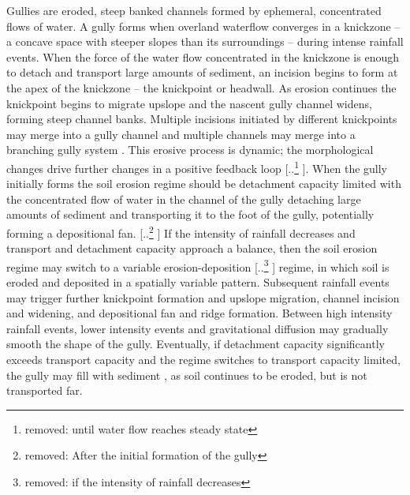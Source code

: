 \documentclass[gmd, manuscript]{copernicus}
\providecommand{\DIFadd}[1]{{\protect\color{blue} \sf #1}} %
\providecommand{\DIFdel}[1]{{\protect\color{red} [..\footnote{removed: #1} ]}} %
\providecommand{\DIFaddbegin}{} %
\providecommand{\DIFaddend}{} %
\providecommand{\DIFdelbegin}{} %
\providecommand{\DIFdelend}{} %
\begin{document}
Gullies are eroded, steep banked channels 
formed by ephemeral, concentrated flows of water.
A gully forms when overland waterflow
converges in a knickzone
-- a concave space with steeper slopes than its surroundings 
\citep{Zahra2017} -- 
during intense rainfall events.  
When the force of the water flow concentrated in the knickzone
is enough to detach and transport large amounts of sediment,
an incision begins to form at the apex of the knickzone 
-- the knickpoint or headwall.
As erosion continues the knickpoint begins to migrate upslope
and the nascent gully channel widens,
forming steep channel banks. 
Multiple incisions initiated by different knickpoints 
may merge into a gully channel
and multiple channels may merge 
into a branching gully system \citep{Mitasova2013}. 
This erosive process is dynamic; 
the morphological changes drive further changes 
in a positive feedback loop\DIFdelbegin \DIFdel{until water flow reaches steady state}\DIFdelend .
When the gully initially forms 
the soil erosion regime should be detachment capacity limited
with the concentrated flow of water in the channel of the gully 
detaching large amounts of sediment 
and transporting it to the foot of the gully, 
potentially forming a depositional fan.
\DIFdelbegin \DIFdel{After the initial formation of the gully
}\DIFdelend %
\DIFaddbegin \DIFadd{If the intensity of rainfall decreases
and transport and detachment capacity 
approach a balance, 
then }\DIFaddend the soil erosion regime may switch to 
\DIFaddbegin \DIFadd{a variable }\DIFaddend erosion-deposition \DIFdelbegin \DIFdel{if the intensity of rainfall decreases}\DIFdelend \DIFaddbegin \DIFadd{regime,
in which soil is eroded and deposited 
in a spatially variable pattern}\DIFaddend .
Subsequent rainfall events may trigger further 
knickpoint formation and upslope migration, 
channel incision and widening, and
depositional fan and ridge formation. 
Between high intensity rainfall events, 
lower intensity events and gravitational diffusion
may gradually smooth the shape of the gully. 
Eventually, if detachment capacity 
significantly exceeds transport capacity
\DIFaddbegin \DIFadd{and the regime switches to transport capacity limited}\DIFaddend , 
the gully may fill with sediment\DIFaddbegin \DIFadd{,
as soil continues to be eroded, but is not transported far}\DIFaddend . 
\end{document}
